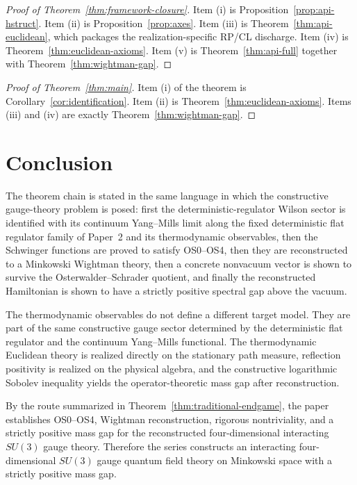 \documentclass[11pt]{article}
\theoremstyle{definition}
\theoremstyle{remark}
\begin{document}
\begin{proof}[Proof of Theorem~\ref{thm:framework-closure}]
Item \textnormal{(i)} is Proposition~\ref{prop:api-hstruct}.
Item \textnormal{(ii)} is Proposition~\ref{prop:axes}.
Item \textnormal{(iii)} is Theorem~\ref{thm:api-euclidean}, which packages the
realization-specific RP/CL discharge.
Item \textnormal{(iv)} is Theorem~\ref{thm:euclidean-axioms}.
Item \textnormal{(v)} is Theorem~\ref{thm:api-full} together with
Theorem~\ref{thm:wightman-gap}.
\end{proof}

\begin{proof}[Proof of Theorem~\ref{thm:main}]
Item \textnormal{(i)} of the theorem is Corollary~\ref{cor:identification}.
Item \textnormal{(ii)} is Theorem~\ref{thm:euclidean-axioms}.
Items \textnormal{(iii)} and \textnormal{(iv)} are exactly
Theorem~\ref{thm:wightman-gap}.
\end{proof}

\section{Conclusion}

The theorem chain is stated in the same language in which the constructive
gauge-theory problem is posed:
first the deterministic-regulator Wilson sector is identified with its
continuum Yang--Mills limit along the fixed deterministic flat regulator family
of Paper~2 and its thermodynamic observables, then the
Schwinger functions are proved to satisfy OS0--OS4, then they are reconstructed
to a Minkowski Wightman theory, then a concrete nonvacuum vector is shown to
survive the Osterwalder--Schrader quotient, and finally the reconstructed
Hamiltonian is shown to have a strictly positive spectral gap above the vacuum.

The thermodynamic observables do not define a different target model.  They are
part of the same constructive gauge sector determined by the deterministic flat
regulator and the continuum Yang--Mills functional.
The thermodynamic Euclidean theory is realized directly on the stationary path
measure, reflection positivity is realized on the physical algebra, and the
constructive logarithmic Sobolev inequality yields the operator-theoretic mass
gap after reconstruction.

By the route summarized in Theorem~\ref{thm:traditional-endgame}, the paper establishes
OS0--OS4, Wightman reconstruction, rigorous nontriviality, and a strictly
positive mass gap for the reconstructed four-dimensional interacting $SU(3)$
gauge theory.
Therefore the series constructs an interacting four-dimensional $SU(3)$
gauge quantum field theory on Minkowski space with a strictly positive
mass gap.
\end{document}
